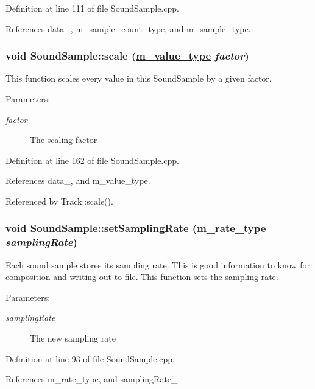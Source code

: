 Definition at line 111 of file Sound\-Sample.cpp.

References data\_\-, m\_\-sample\_\-count\_\-type, and m\_\-sample\_\-type.\hypertarget{classSoundSample_a9}{
\subsubsection[scale]{\setlength{\rightskip}{0pt plus 5cm}void Sound\-Sample::scale (\hyperlink{Types_8h_a3}{m\_\-value\_\-type} {\em factor})}}
\label{classSoundSample_a9}


This function scales every value in this Sound\-Sample by a given factor. \begin{Desc}
\item[Parameters:]
\begin{description}
\item[{\em factor}]The scaling factor \end{description}
\end{Desc}


Definition at line 162 of file Sound\-Sample.cpp.

References data\_\-, and m\_\-value\_\-type.

Referenced by Track::scale().\hypertarget{classSoundSample_a4}{
\subsubsection[setSamplingRate]{\setlength{\rightskip}{0pt plus 5cm}void Sound\-Sample::set\-Sampling\-Rate (\hyperlink{Types_8h_a4}{m\_\-rate\_\-type} {\em sampling\-Rate})}}
\label{classSoundSample_a4}


Each sound sample stores its sampling rate. This is good information to know for composition and writing out to file. This function sets the sampling rate. \begin{Desc}
\item[Parameters:]
\begin{description}
\item[{\em sampling\-Rate}]The new sampling rate \end{description}
\end{Desc}


Definition at line 93 of file Sound\-Sample.cpp.

References m\_\-rate\_\-type, and sampling\-Rate\_\-.

